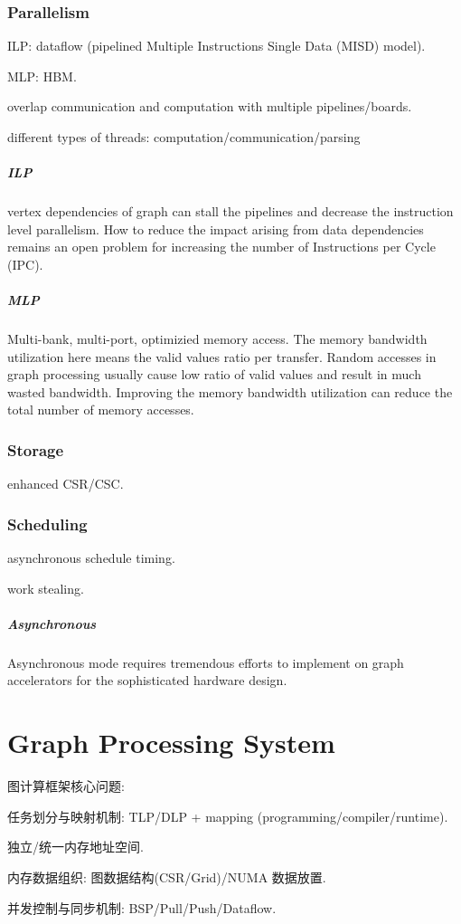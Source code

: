 \documentclass[UTF8,12pt,a4paper]{article}
\begin{document}
\subsubsection{Parallelism}
\begin{compactitem}
  \item ILP: dataflow (pipelined Multiple Instructions Single Data (MISD) model).
  \item MLP: HBM.
  \item overlap communication and computation with multiple pipelines/boards.
  \item different types of threads: computation/communication/parsing
\end{compactitem}

\subparagraph{ILP}
vertex dependencies of graph can stall the pipelines
and decrease the instruction level parallelism.
How to reduce the impact arising from data dependencies
remains an open problem for increasing the number of Instructions per Cycle (IPC).

\subparagraph{MLP}
Multi-bank, multi-port, optimizied memory access.
The memory bandwidth utilization here means
the valid values ratio per transfer.
Random accesses in graph processing usually cause
low ratio of valid values and result in much wasted bandwidth.
Improving the memory bandwidth utilization can reduce the total number of memory accesses.

\subsubsection{Storage}
\begin{compactitem}
  \item enhanced CSR/CSC.
\end{compactitem}
\subsubsection{Scheduling}
\begin{compactitem}
  \item asynchronous schedule timing.
  \item work stealing.
\end{compactitem}

\subparagraph{Asynchronous}
Asynchronous mode requires tremendous efforts
to implement on graph accelerators for the sophisticated hardware design.
\clearpage

\section{Graph Processing System}
图计算框架核心问题:
\begin{compactitem}
  \item 任务划分与映射机制: TLP/DLP + mapping (programming/compiler/runtime).
  \item 独立/统一内存地址空间.
  \item 内存数据组织: 图数据结构(CSR/Grid)/NUMA 数据放置.
  \item 并发控制与同步机制: BSP/Pull/Push/Dataflow.
\end{compactitem}
\end{document}

